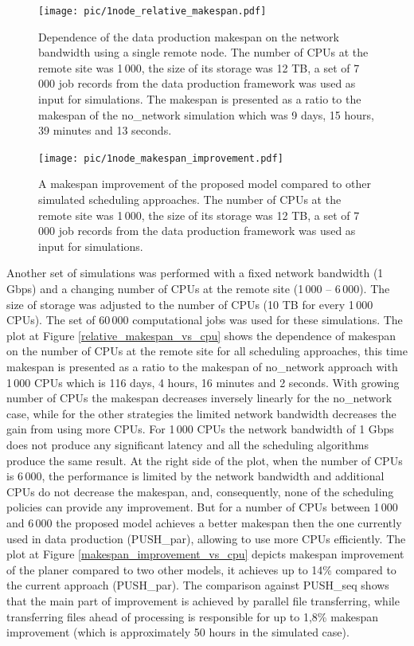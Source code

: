 \documentclass{svjour3}                     %
\begin{document}
\begin{figure}
\centering
\begin{minipage}{1\textwidth}
\centering
    \texttt{[image: pic/1node\_relative\_makespan.pdf]}
    \caption{Dependence of the data production makespan on the network bandwidth using a single remote node. The number of CPUs at the remote site was 1\,000, the size of its storage was 12 TB, a set of 7\,000 job records from the data production framework was used as input for simulations. The makespan is presented as a ratio to the makespan of the no\_network simulation which was 9 days, 15 hours, 39 minutes and 13 seconds.}
    \label{1node_relative_makespan}
\end{minipage}\hspace{1pc}%
\begin{minipage}{1\textwidth}
\centering
    \texttt{[image: pic/1node\_makespan\_improvement.pdf]}
    \caption{A makespan improvement of the proposed model compared to other simulated scheduling approaches. The number of CPUs at the remote site was 1\,000, the size of its storage was 12 TB, a set of 7\,000 job records from the data production framework was used as input for simulations.}
    \label{1node_makespan_improvement}
\end{minipage} 
\end{figure}

Another set of simulations was performed with a fixed network bandwidth (1 Gbps) and a changing number of CPUs at the remote site (1\,000 -- 6\,000). The size of storage was adjusted to the number of CPUs (10 TB for every 1\,000 CPUs). The set of 60\,000 computational jobs was used for these simulations. The plot at Figure \ref{relative_makespan_vs_cpu} shows the dependence of makespan on the number of CPUs at the remote site for all scheduling approaches, this time makespan is presented as a ratio to the makespan of no\_network approach with 1\,000 CPUs which is 116 days, 4 hours, 16 minutes and 2 seconds. With growing number of CPUs the makespan decreases inversely linearly for the no\_network case, while for the other strategies the limited network bandwidth decreases the gain from using more CPUs. For 1\,000 CPUs the network bandwidth of 1 Gbps does not produce any significant latency and all the scheduling algorithms produce the same result. At the right side of the plot, when the number of CPUs is 6\,000, the performance is limited by the network bandwidth and additional CPUs do not decrease the makespan, and, consequently, none of the scheduling policies can provide any improvement. But for a number of CPUs between 1\,000 and 6\,000 the proposed model achieves a better makespan then the one currently used in data production (PUSH\_par), allowing to use more CPUs efficiently. The plot at Figure \ref{makespan_improvement_vs_cpu} depicts makespan improvement of the planer compared to two other models, it achieves up to 14\% compared to the current approach (PUSH\_par). The comparison against PUSH\_seq shows that the main part of improvement is achieved by parallel file transferring, while transferring files ahead of processing is responsible for up to 1,8\% makespan improvement (which is approximately 50 hours in the simulated case).
\end{document}
